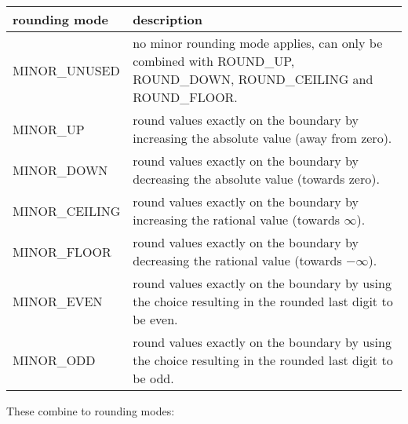 \documentclass[10pt,a4paper]{article}
\begin{document}
\begin{tabular}{|l|p{100mm}|}
\hline
{\bfseries rounding mode}&{\bfseries description}\\
\hline
  MINOR\_UNUSED  & no minor rounding mode applies, can only be combined with ROUND\_UP, ROUND\_DOWN, ROUND\_CEILING and ROUND\_FLOOR.\\
\hline
  MINOR\_UP      & round values exactly on the boundary by increasing the absolute value (away from zero).\\
\hline
  MINOR\_DOWN    & round values exactly on the boundary by decreasing the absolute value (towards zero).\\
\hline
  MINOR\_CEILING & round values exactly on the boundary by increasing the rational value (towards $\infty$).\\
\hline
  MINOR\_FLOOR   & round values exactly on the boundary by decreasing the rational value (towards $-\infty$).\\
\hline
  MINOR\_EVEN    & round values exactly on the boundary by using the choice resulting in the rounded last digit to be even.\\
\hline
  MINOR\_ODD     & round values exactly on the boundary by using the choice resulting in the rounded last digit to be odd.\\
\hline
\end{tabular}

\pagebreak

These combine to rounding modes:
\end{document}
